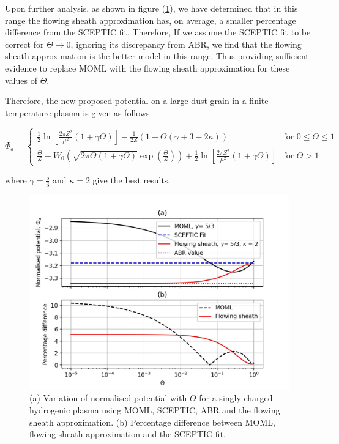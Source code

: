 \documentclass{article}
\begin{document}
Upon further analysis, as shown in figure (\ref{MOMLvsFS}), we have determined 
that in this range the flowing sheath approximation has, on average, 
a smaller percentage difference from the SCEPTIC fit. Therefore, If we assume
the SCEPTIC fit to be correct for $\Theta \to 0$, ignoring its discrepancy from ABR, we find that the
flowing sheath approximation is the better model in this range. Thus providing sufficient evidence to replace MOML with 
the flowing sheath approximation for these values of $\Theta$.

Therefore, the new proposed potential on a large dust grain in a finite temperature plasma is given as follows

\begin{equation}
\Phi_a = 
\begin{cases}
\frac{1}{2}\ln{\left[\frac{2\pi Z^2}{\mu^2}(1 + \gamma \Theta)\right]} - \frac{1}{2Z}\left(1 + \Theta\left(\gamma + 3 -2\kappa\right)\right) & \text{for }0 \leq \Theta \leq 1\\
\frac{\Theta}{Z} - W_{0}\left(\sqrt{2\pi \Theta (1 + \gamma \Theta)} \exp{\left (\frac{\Theta}{Z}\right)}\right) + \frac{1}{2}\ln{\left[\frac{2\pi Z^2}{\mu^2}(1 + \gamma \Theta)\right]} & \text{for } \Theta > 1
\end{cases}
\end{equation}

\noindent where $\gamma = \frac{5}{3}$ and $\kappa = 2$ give the best results.

\begin{figure}[H]
\centering
\includegraphics[width=\linewidth]{Output/MOMLvsFS.jpeg}
\caption{(a) Variation of normalised potential with $\Theta$ for a singly charged hydrogenic plasma using MOML, SCEPTIC,
ABR and the flowing sheath approximation. (b) Percentage difference between MOML, flowing 
sheath approximation and the SCEPTIC fit.}
\label{MOMLvsFS} 
\end{figure}
\end{document}
